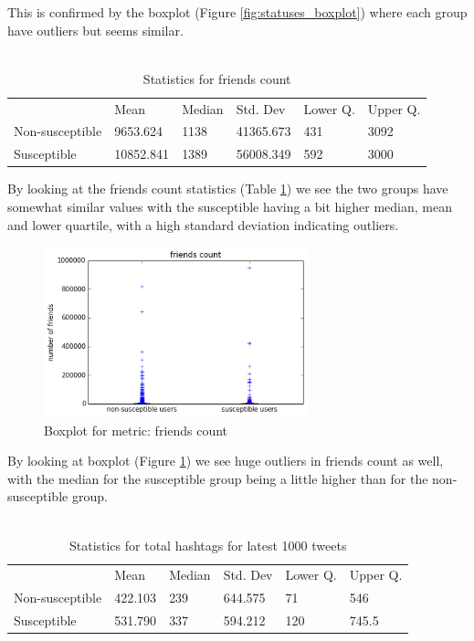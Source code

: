 \documentclass[10pt]{IEEEtran}
\begin{document}
This is confirmed by the boxplot (Figure \ref{fig:statuses_boxplot}) where each group have outliers but seems similar.\\\\
\begin{table}[H]
\begin{tabular}{llllll}
\textbf{}       & Mean      & Median & Std. Dev  & Lower Q. & Upper Q. \\
Non-susceptible & 9653.624  & 1138   & 41365.673 & 431     &  3092     \\
Susceptible     & 10852.841 & 1389   & 56008.349 & 592    &   3000   
\end{tabular}
\caption{Statistics for friends count}
\label{tab:friends_count}
\end{table}

By looking at the friends count statistics (Table \ref{tab:friends_count}) we see the two groups have somewhat similar values with the susceptible having a bit higher median, mean and lower quartile, with a high standard deviation indicating outliers.
\begin{figure}[H]
  \centering
  \includegraphics[width=3.0in]{friends_boxplot}
  \caption{Boxplot for metric: friends count}
  \label{fig:friends_boxplot}
\end{figure}
By looking at boxplot (Figure \ref{fig:friends_boxplot}) we see huge outliers in friends count as well, with the median for the susceptible group being a little higher than for the non-susceptible group.\\\\
\begin{table}[H]
\begin{tabular}{llllll}
\textbf{}       & Mean    & Median & Std. Dev & Lower Q. & Upper Q. \\
Non-susceptible & 422.103 & 239    & 644.575  & 71     & 546        \\
Susceptible     & 531.790 & 337    & 594.212  & 120    &  745.5    
\end{tabular}
\caption{Statistics for total hashtags for latest 1000 tweets}
\label{tab:hashtags}
\end{table}
\end{document}
